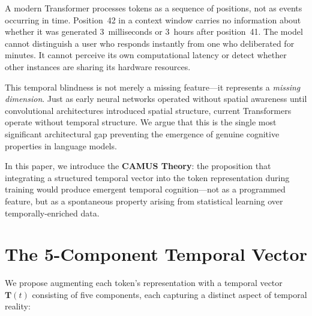 \documentclass[10pt,twocolumn,letterpaper]{article}
\begin{document}
A modern Transformer processes tokens as a sequence of positions, not as events occurring in time. Position~42 in a context window carries no information about whether it was generated 3~milliseconds or 3~hours after position~41. The model cannot distinguish a user who responds instantly from one who deliberated for minutes. It cannot perceive its own computational latency or detect whether other instances are sharing its hardware resources.

This temporal blindness is not merely a missing feature---it represents a \emph{missing dimension}. Just as early neural networks operated without spatial awareness until convolutional architectures introduced spatial structure, current Transformers operate without temporal structure. We argue that this is the single most significant architectural gap preventing the emergence of genuine cognitive properties in language models.

In this paper, we introduce the \textbf{CAMUS Theory}: the proposition that integrating a structured temporal vector into the token representation during training would produce emergent temporal cognition---not as a programmed feature, but as a spontaneous property arising from statistical learning over temporally-enriched data.

\section{The 5-Component Temporal Vector}

We propose augmenting each token's representation with a temporal vector $\mathbf{T}(t)$ consisting of five components, each capturing a distinct aspect of temporal reality:
\end{document}
